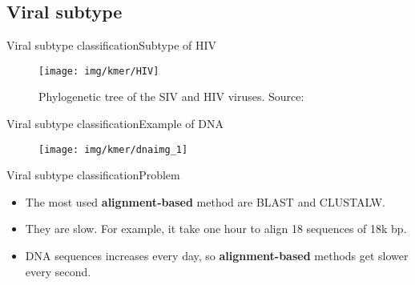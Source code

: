 \documentclass[10pt]{beamer}
\newcommand{\1}{
        	\setbeamertemplate{background}{
        		\texttt{[image: img/1]}
        		\tikz[overlay] \fill[fill opacity=0.75,fill=white] (0,0) rectangle (-\paperwidth,\paperheight);
        	}
}
\begin{document}
\subsection{Viral subtype}

\begin{frame}{Viral subtype classification}{Subtype of HIV}
	\begin{figure}[]
		\centering
		\texttt{[image: img/kmer/HIV]}
		\label{img:mot2}
		\caption{Phylogenetic tree of the SIV and HIV viruses. Source: \cite{hivwiki2020}}
	\end{figure}
\end{frame}

\begin{frame}{Viral subtype classification}{Example of DNA}
	\begin{figure}[]
		\centering
		\texttt{[image: img/kmer/dnaimg\_1]}
		\label{img:mot2}
	\end{figure}
\end{frame}


\begin{frame}{Viral subtype classification}{Problem}
	\begin{block}{}
		\begin{itemize}
			\item The most used \textbf{alignment-based} method are BLAST and CLUSTALW. \pause
			\item They are slow. For example, it take one hour to align 18 sequences of 18k bp. \pause
			\item DNA sequences increases every day, so \textbf{alignment-based} methods get slower every second.
		\end{itemize}
	\end{block}
\end{frame}
\end{document}

